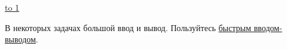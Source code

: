 \documentclass[12pt,a4paper,oneside]{article}
\renewcommand{\t}{\texttt}
\newcommand{\ProblemLabel}{undefined}
\newcommand{\ProblemTL}{undefined}
\newcommand{\ProblemML}{undefined}
\newcommand{\ProblemName}{undefined}
\def\t{\texttt}
\def\LINE{\vspace*{-1em}\noindent \underline{\hbox to 1\textwidth{{ } \hfil{ } \hfil{ } }}}
\def\probl#1#2#3#4{
  \renewcommand{\ProblemName}{#1}
  \renewcommand{\ProblemLabel}{#2}
  \renewcommand{\ProblemTL}{#3}
  \renewcommand{\ProblemML}{#4}
  
}
\newcommand{\Section}[2]{
  \hbox{\hspace{1em}}
  \vspace*{-2.5em}
  \section*{\color{#1}{#2}}
  \addcontentsline{toc}{section}{\color{#1}{#2}}
  \vspace*{-0.5em}
}
\begin{document}
\vspace*{-2.8em}

\tableofcontents

\vspace*{0.8em}
\LINE
\vspace*{0.8em}



\noindent{}В некоторых задачах большой ввод и вывод. 
Пользуйтесь \href{https://ejudge.lksh.ru/A/lib/example_io.cpp.html}{быстрым вводом-выводом}.



\pagebreak


\probl{sum}{A}{0.05 sec}{256 mb}
\probl{lca_rmq}{B}{2.5 sec}{256 mb}
\probl{union}{C}{0.75 sec}{256 mb}
\probl{roads}{D}{0.6 sec}{256 mb}
\probl{tree}{E}{1.5 sec}{256 mb}

\end{document}
